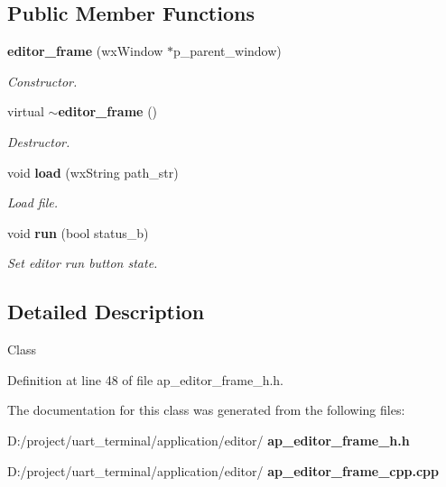 \subsection*{Public Member Functions}
\begin{DoxyCompactItemize}
\item 
\textbf{ editor\+\_\+frame} (wx\+Window $\ast$p\+\_\+parent\+\_\+window)
\begin{DoxyCompactList}\small\item\em Constructor. \end{DoxyCompactList}\item 
virtual \textbf{ $\sim$editor\+\_\+frame} ()
\begin{DoxyCompactList}\small\item\em Destructor. \end{DoxyCompactList}\item 
void \textbf{ load} (wx\+String path\+\_\+str)
\begin{DoxyCompactList}\small\item\em Load file. \end{DoxyCompactList}\item 
void \textbf{ run} (bool status\+\_\+b)
\begin{DoxyCompactList}\small\item\em Set editor run button state. \end{DoxyCompactList}\end{DoxyCompactItemize}


\subsection{Detailed Description}
Class 

Definition at line 48 of file ap\+\_\+editor\+\_\+frame\+\_\+h.\+h.



The documentation for this class was generated from the following files\+:\begin{DoxyCompactItemize}
\item 
D\+:/project/uart\+\_\+terminal/application/editor/\textbf{ ap\+\_\+editor\+\_\+frame\+\_\+h.\+h}\item 
D\+:/project/uart\+\_\+terminal/application/editor/\textbf{ ap\+\_\+editor\+\_\+frame\+\_\+cpp.\+cpp}\end{DoxyCompactItemize}
